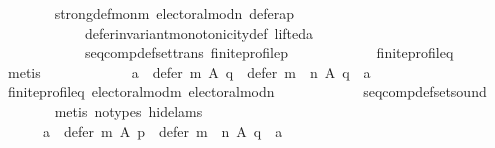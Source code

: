 \begin{isabellebody}
\ \ \ \ \ \ \isamarkupfalse%
\ strong{\isacharunderscore}{\kern0pt}def{\isacharunderscore}{\kern0pt}mon{\isacharunderscore}{\kern0pt}m\ electoral{\isacharunderscore}{\kern0pt}mod{\isacharunderscore}{\kern0pt}n\ defer{\isacharunderscore}{\kern0pt}a{\isacharunderscore}{\kern0pt}p\isanewline
\ \ \ \ \ \ \ \ \ \ \ \ defer{\isacharunderscore}{\kern0pt}invariant{\isacharunderscore}{\kern0pt}monotonicity{\isacharunderscore}{\kern0pt}def\ lifted{\isacharunderscore}{\kern0pt}a\isanewline
\ \ \ \ \ \ \ \ \ \ \ \ seq{\isacharunderscore}{\kern0pt}comp{\isacharunderscore}{\kern0pt}def{\isacharunderscore}{\kern0pt}set{\isacharunderscore}{\kern0pt}trans\ finite{\isacharunderscore}{\kern0pt}profile{\isacharunderscore}{\kern0pt}p\isanewline
\ \ \ \ \ \ \ \ \ \ \ \ finite{\isacharunderscore}{\kern0pt}profile{\isacharunderscore}{\kern0pt}q\isanewline
\ \ \ \ \ \ \isamarkupfalse%
\ metis\isanewline
\ \ \ \ \isamarkupfalse%
\ \isamarkupfalse%
\isanewline
\ \ \ \ \ \ {\isachardoublequoteopen}{\isacharbraceleft}{\kern0pt}a{\isacharbraceright}{\kern0pt}\ {\isacharequal}{\kern0pt}\ defer\ m\ A\ q\ {\isasymlongrightarrow}\ defer\ {\isacharparenleft}{\kern0pt}m\ {\isasymtriangleright}\ n{\isacharparenright}{\kern0pt}\ A\ q\ {\isasymsubseteq}\ {\isacharbraceleft}{\kern0pt}a{\isacharbraceright}{\kern0pt}{\isachardoublequoteclose}\isanewline
\ \ \ \ \ \ \isamarkupfalse%
\ finite{\isacharunderscore}{\kern0pt}profile{\isacharunderscore}{\kern0pt}q\ electoral{\isacharunderscore}{\kern0pt}mod{\isacharunderscore}{\kern0pt}m\ electoral{\isacharunderscore}{\kern0pt}mod{\isacharunderscore}{\kern0pt}n\isanewline
\ \ \ \ \ \ \ \ \ \ \ \ seq{\isacharunderscore}{\kern0pt}comp{\isacharunderscore}{\kern0pt}def{\isacharunderscore}{\kern0pt}set{\isacharunderscore}{\kern0pt}sound\isanewline
\ \ \ \ \ \ \isamarkupfalse%
\ {\isacharparenleft}{\kern0pt}metis\ {\isacharparenleft}{\kern0pt}no{\isacharunderscore}{\kern0pt}types{\isacharcomma}{\kern0pt}\ hide{\isacharunderscore}{\kern0pt}lams{\isacharparenright}{\kern0pt}{\isacharparenright}{\kern0pt}\isanewline
\ \ \ \ \isamarkupfalse%
\ \isamarkupfalse%
\isanewline
\ \ \ \ \ \ {\isachardoublequoteopen}{\isacharparenleft}{\kern0pt}a\ {\isasymin}\ defer\ m\ A\ p{\isacharparenright}{\kern0pt}\ {\isasymlongrightarrow}\ defer\ {\isacharparenleft}{\kern0pt}m\ {\isasymtriangleright}\ n{\isacharparenright}{\kern0pt}\ A\ q\ {\isasymsubseteq}\ {\isacharbraceleft}{\kern0pt}a{\isacharbraceright}{\kern0pt}{\isachardoublequoteclose}\isanewline

\end{isabellebody}
